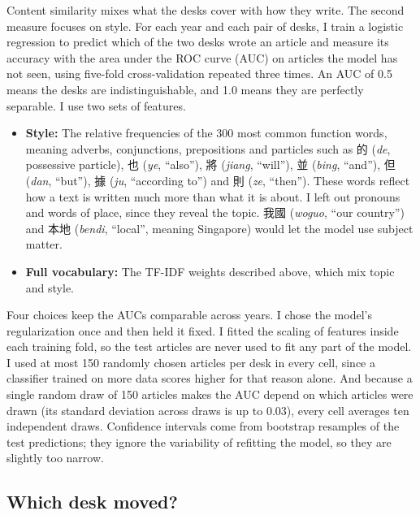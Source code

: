 \documentclass[11pt]{article}
\begin{document}
Content similarity mixes what the desks cover with how they write. The second measure focuses on style. For each year and each pair of desks, I train a logistic regression to predict which of the two desks wrote an article and measure its accuracy with the area under the ROC curve (AUC) on articles the model has not seen, using five-fold cross-validation repeated three times. An AUC of 0.5 means the desks are indistinguishable, and 1.0 means they are perfectly separable. I use two sets of features.

\begin{itemize}
\item \textbf{Style:} The relative frequencies of the 300 most common function words, meaning adverbs, conjunctions, prepositions and particles such as 的 (\textit{de}, possessive particle), 也 (\textit{ye}, ``also''), 將 (\textit{jiang}, ``will''), 並 (\textit{bing}, ``and''), 但 (\textit{dan}, ``but''), 據 (\textit{ju}, ``according to'') and 則 (\textit{ze}, ``then''). These words reflect how a text is written much more than what it is about. I left out pronouns and words of place, since they reveal the topic. 我國 (\textit{woguo}, ``our country'') and 本地 (\textit{bendi}, ``local'', meaning Singapore) would let the model use subject matter.
\item \textbf{Full vocabulary:} The TF-IDF weights described above, which mix topic and style.
\end{itemize}

\noindent Four choices keep the AUCs comparable across years. I chose the model's regularization once and then held it fixed. I fitted the scaling of features inside each training fold, so the test articles are never used to fit any part of the model. I used at most 150 randomly chosen articles per desk in every cell, since a classifier trained on more data scores higher for that reason alone. And because a single random draw of 150 articles makes the AUC depend on which articles were drawn (its standard deviation across draws is up to 0.03), every cell averages ten independent draws. Confidence intervals come from bootstrap resamples of the test predictions; they ignore the variability of refitting the model, so they are slightly too narrow.

\subsection{Which desk moved?}
\end{document}
